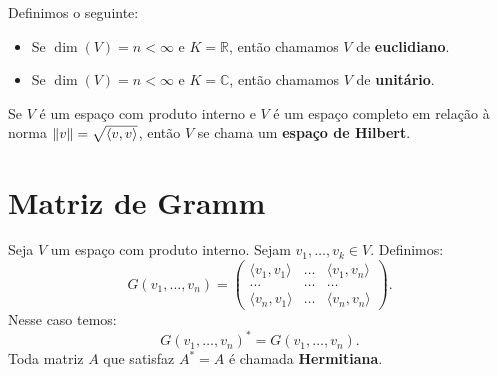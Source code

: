 \documentclass[11pt,twoside,a4paper]{book}
\begin{document}
\begin{definicao}
Definimos o seguinte:
\begin{itemize}
\item Se $\dim(V)=n<\infty$ e $K=\mathbb{R}$, então chamamos $V$ de \textbf{euclidiano}.
\item Se $\dim(V)=n<\infty$ e $K=\mathbb{C}$, então chamamos $V$ de \textbf{unitário}.
\end{itemize}
\end{definicao}

\begin{definicao}
Se $V$ é um espaço com produto interno e $V$ é um espaço completo em relação à norma $\norm{v}=\sqrt{\langle v,v\rangle}$, então $V$ se chama um \textbf{espaço de Hilbert}.
\end{definicao}

\section{Matriz de Gramm}

\begin{definicao}
Seja $V$ um espaço com produto interno. Sejam $v_1,\dots,v_k\in V$. Definimos:
\[
G(v_1,\dots,v_n)=\begin{pmatrix}
\langle v_1,v_1\rangle&\dots&\langle v_1,v_n\rangle\\\dots&\dots&\dots\\\langle v_n,v_1\rangle&\dots&\langle v_n,v_n\rangle
\end{pmatrix}.
\]
Nesse caso temos:
\[
G(v_1,\dots,v_n)^*=G(v_1,\dots,v_n).
\]
Toda matriz $A$ que satisfaz $A^*=A$ é chamada \textbf{Hermitiana}.
\end{definicao}
\end{document}
